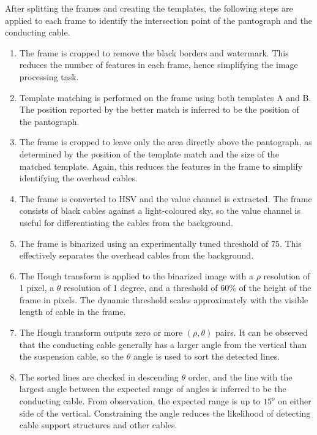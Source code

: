 After splitting the frames and creating the templates, the following steps are applied to each frame to identify the intersection point of the pantograph and the conducting cable.
\begin{enumerate}
  \item The frame is cropped to remove the black borders and watermark. This reduces the number of features in each frame, hence simplifying the image processing task.

  \item Template matching is performed on the frame using both templates A and B. The position reported by the better match is inferred to be the position of the pantograph.

  \item The frame is cropped to leave only the area directly above the pantograph, as determined by the position of the template match and the size of the matched template. Again, this reduces the features in the frame to simplify identifying the overhead cables.

  \item The frame is converted to HSV and the value channel is extracted. The frame consists of black cables against a light-coloured sky, so the value channel is useful for differentiating the cables from the background.

  \item The frame is binarized using an experimentally tuned threshold of 75. This effectively separates the overhead cables from the background.

  \item The Hough transform is applied to the binarized image with a $\rho$ resolution of 1 pixel, a $\theta$ resolution of 1 degree, and a threshold of 60\% of the height of the frame in pixels. The dynamic threshold scales approximately with the visible length of cable in the frame.

  \item The Hough transform outputs zero or more $(\rho,\theta)$ pairs. It can be observed that the conducting cable generally has a larger angle from the vertical than the suspension cable, so the $\theta$ angle is used to sort the detected lines.

  \item The sorted lines are checked in descending $\theta$ order, and the line with the largest angle between the expected range of angles is inferred to be the conducting cable. From observation, the expected range is up to $15^o$ on either side of the vertical. Constraining the angle reduces the likelihood of detecting cable support structures and other cables.


\end{enumerate}
